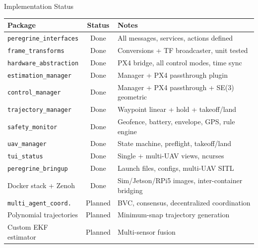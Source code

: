 \documentclass[aspectratio=169, 10pt]{beamer}
\begin{document}
\begin{frame}{Implementation Status}
\small
\begin{tabularx}{\textwidth}{@{}lcX@{}}
\toprule
\textbf{Package} & \textbf{Status} & \textbf{Notes} \\
\midrule
\texttt{peregrine\_interfaces} & \textcolor{accentgreen}{Done} & All messages, services, actions defined \\
\texttt{frame\_transforms} & \textcolor{accentgreen}{Done} & Conversions + TF broadcaster, unit tested \\
\texttt{hardware\_abstraction} & \textcolor{accentgreen}{Done} & PX4 bridge, all control modes, time sync \\
\texttt{estimation\_manager} & \textcolor{accentgreen}{Done} & Manager + PX4 passthrough plugin \\
\texttt{control\_manager} & \textcolor{accentgreen}{Done} & Manager + PX4 passthrough + SE(3) geometric \\
\texttt{trajectory\_manager} & \textcolor{accentgreen}{Done} & Waypoint linear + hold + takeoff/land \\
\texttt{safety\_monitor} & \textcolor{accentgreen}{Done} & Geofence, battery, envelope, GPS, rule engine \\
\texttt{uav\_manager} & \textcolor{accentgreen}{Done} & State machine, preflight, takeoff/land \\
\texttt{tui\_status} & \textcolor{accentgreen}{Done} & Single + multi-UAV views, ncurses \\
\texttt{peregrine\_bringup} & \textcolor{accentgreen}{Done} & Launch files, configs, multi-UAV SITL \\
Docker stack + Zenoh & \textcolor{accentgreen}{Done} & Sim/Jetson/RPi5 images, inter-container bridging \\
\addlinespace
\texttt{multi\_agent\_coord.} & \textcolor{accentamber}{Planned} & BVC, consensus, decentralized coordination \\
Polynomial trajectories & \textcolor{accentamber}{Planned} & Minimum-snap trajectory generation \\
Custom EKF estimator & \textcolor{accentamber}{Planned} & Multi-sensor fusion \\
\bottomrule
\end{tabularx}
\end{frame}
\end{document}
